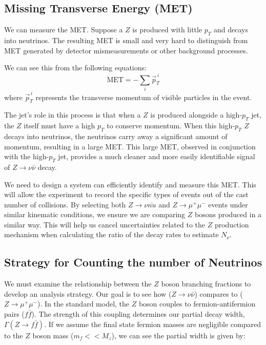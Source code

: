 \subsection{Missing Transverse Energy (MET)}
We can measure the MET. Suppose a $Z$ is produced with little $p_T$ and decays into neutrinos. The resulting MET is small and very hard to distinguish from MET generated by detector mismeasurements or other background processes.

We can see this from the following equations:
\begin{equation}
    \text{MET} = -\sum_i \vec{p}_T^{\,i}
\end{equation}
where $\vec{p}_T^{\,i}$ represents the transverse momentum of visible particles in the event.

The jet's role in this process is that when a $Z$ is produced alongside a high-$p_T$ jet, the $Z$ itself must have a high $p_T$ to conserve momentum. When this high-$p_T$ $Z$ decays into neutrinos, the neutrinos carry away a significant amount of momentum, resulting in a large MET. This large MET, observed in conjunction with the high-$p_T$ jet, provides a much cleaner and more easily identifiable signal of $Z \to \nu \bar{\nu}$ decay.

We need to design a system can efficiently identify and measure this MET. This will allow the experiment to record the specific types of events out of the cast number of collisions. By selecting both $Z \to \nu \bar{nu}$ and $Z \to \mu^+ \mu^-$  events under similar kinematic conditions, we ensure we are comparing $Z$ bosons produced in a similar way. This will help us cancel uncertainties related to the  $Z$ production mechanism when calculating the ratio of the decay rates to estimate $N_{\nu}$.

\subsection{Strategy for Counting the number of Neutrinos}
We must examine the relationship between the $Z$ boson branching fractions to develop an analysis strategy. Our goal is to see how ($Z \to \nu \bar{\nu}$) compares to ($Z \to \mu^+ \mu^-$). In the standard model, the $Z$ boson couples to fermion-antifermion pairs ($f \bar{f}$). The strength of this coupling determines our partial decay width, $\Gamma(Z \to f \bar{f})$. If we assume the final state fermion masses are negligible compared to the $Z$ boson mass ($m_f << M_z$), we can see the partial width is given by:

